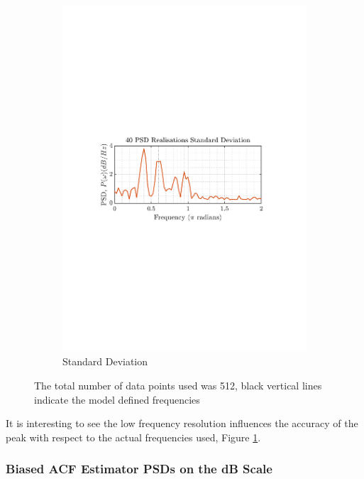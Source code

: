 \documentclass[12pt]{article}
\numberwithin{equation}{section}
\begin{document}
\begin{figure}[H]
		\begin{subfigure}{0.49\textwidth}
			\centering
			\includegraphics[trim={2.2cm 11.2cm 3.15cm  11.2cm}, clip, width=\textwidth]{../MATLAB/figures/q1_3b_fig02.pdf} 
			\captionsetup{justification=centering}
			\caption{Standard Deviation}
		\end{subfigure}
		\captionsetup{justification=centering}
		\caption{The total number of data points used was 512, black vertical lines indicate the model defined frequencies}
		\label{fig: 1-3b}
	\end{figure}

	It is interesting to see the low frequency resolution influences the accuracy of the peak with respect to the actual frequencies used, Figure \ref{fig: 1-3b}.

	\subsubsection{Biased ACF Estimator PSDs on the dB Scale}
\end{document}
